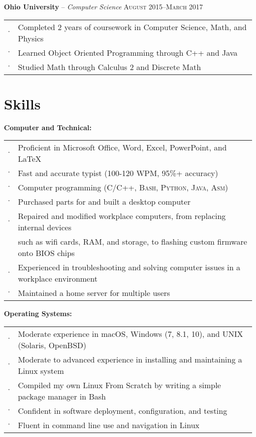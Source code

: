 \documentclass[letterpaper,12pt]{article}
\begin{document}
\textbf{Ohio University} -- \textit{Computer Science} \hfill \textsc{August 2015--March 2017}

\begin{tabular}{rl}
$\cdot$ & Completed 2 years of coursework in Computer Science, Math, and Physics \\
$\cdot$ & Learned Object Oriented Programming through C++ and Java \\
$\cdot$ & Studied Math through Calculus 2 and Discrete Math \\
\end{tabular}

\section{Skills}

\textbf{Computer and Technical:}

\begin{tabular}{rl}
$\cdot$ & Proficient in Microsoft Office, Word, Excel, PowerPoint, and \LaTeX \\
$\cdot$ & Fast and accurate typist (100-120 WPM, 95\%+ accuracy) \\
$\cdot$ & Computer programming (\textsc{C/C++, Bash, Python, Java, Asm}) \\
$\cdot$ & Purchased parts for and built a desktop computer \\
$\cdot$ & Repaired and modified workplace computers, from replacing internal devices \\
        & such as wifi cards, RAM, and storage, to flashing custom firmware onto BIOS chips \\
$\cdot$ & Experienced in troubleshooting and solving computer issues in a workplace environment \\
$\cdot$ & Maintained a home server for multiple users \\
\end{tabular}

\textbf{Operating Systems:}

\begin{tabular}{rl}
$\cdot$ & Moderate experience in macOS, Windows (7, 8.1, 10), and UNIX (Solaris, OpenBSD) \\
$\cdot$ & Moderate to advanced experience in installing and maintaining a Linux system \\
$\cdot$ & Compiled my own Linux From Scratch by writing a simple package manager in Bash \\
$\cdot$ & Confident in software deployment, configuration, and testing \\
$\cdot$ & Fluent in command line use and navigation in Linux \\
\end{tabular}
\end{document}
